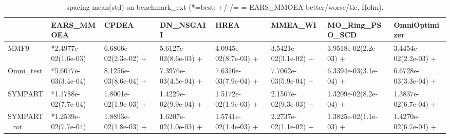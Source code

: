 \begin{table}[t]
\centering
\caption{spacing mean(std) on benchmark_ext (*=best; +/-/= = EARS_MMOEA better/worse/tie, Holm).}
\label{tab:benchmark_ext_spacing}
\begin{tabular}{llllllll}
\toprule
 & EARS\_MMOEA & CPDEA & DN\_NSGAII & HREA & MMEA\_WI & MO\_Ring\_PSO\_SCD & OmniOptimizer \\
\midrule
MMF9 & *2.4977e-02(1.6e-03) & 6.6806e-02(2.3e-02) + & 5.6127e-02(8.6e-03) + & 4.0945e-02(8.7e-03) + & 3.5421e-02(3.1e-02) + & 3.9518e-02(2.2e-03) + & 3.4454e-02(2.2e-03) + \\
Omni\_test & *5.6077e-03(3.4e-04) & 8.1256e-03(8.6e-04) + & 7.3976e-03(4.5e-04) + & 7.6310e-03(7.9e-04) + & 7.7062e-03(5.9e-04) + & 6.3394e-03(3.1e-04) + & 6.6728e-03(3.3e-04) + \\
SYMPART & *1.1788e-02(7.7e-04) & 1.8001e-02(1.9e-03) + & 1.4229e-02(9.9e-04) + & 1.5172e-02(1.9e-03) + & 2.1507e-02(9.3e-03) + & 1.3209e-02(8.2e-04) + & 1.3837e-02(6.7e-04) + \\
SYMPART\_rot & *1.2539e-02(7.7e-04) & 1.8893e-02(1.8e-03) + & 1.6207e-02(1.0e-03) + & 1.5741e-02(1.4e-03) + & 2.2737e-02(1.1e-02) + & 1.3825e-02(1.1e-03) + & 1.4270e-02(6.7e-04) + \\
\bottomrule
\end{tabular}
\end{table}
